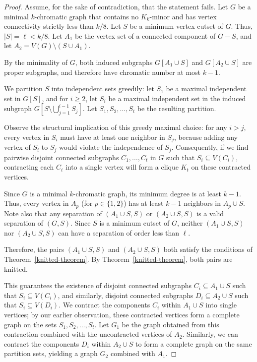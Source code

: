 \documentclass[11pt]{amsart}
\begin{document}
\begin{proof}
Assume, for the sake of contradiction, that the statement fails. Let $G$ be a minimal $k$-chromatic graph that contains no $K_k$-minor and has vertex connectivity strictly less than $k/8$. Let $S$ be a minimum vertex cutset of $G$. Thus, $|S|=\ell < k/8$. Let $A_1$ be the vertex set of a connected component of $G-S$, and let $A_2 = V(G) \setminus (S \cup A_1)$. 

By the minimality of $G$, both induced subgraphs $G[A_1\cup S]$ and $G[A_2\cup S]$ are proper subgraphs, and therefore have chromatic number at most $k-1$. 

We partition $S$ into independent sets greedily: let $S_1$ be a maximal independent set in $G[S]$, and for $i\ge 2$, let $S_i$ be a maximal independent set in the induced subgraph $G[S\setminus \bigcup_{j=1}^{i-1} S_j]$. Let $S_1, S_2, \ldots, S_t$ be the resulting partition. 

Observe the structural implication of this greedy maximal choice: for any $i > j$, every vertex in $S_i$ must have at least one neighbor in $S_j$, because adding any vertex of $S_i$ to $S_j$ would violate the independence of $S_j$. Consequently, if we find pairwise disjoint connected subgraphs $C_1, \ldots, C_t$ in $G$ such that $S_i \subseteq V(C_i)$, contracting each $C_i$ into a single vertex will form a clique $K_t$ on these contracted vertices.

Since $G$ is a minimal $k$-chromatic graph, its minimum degree is at least $k-1$. Thus, every vertex in $A_p$ (for $p \in \{1,2\}$) has at least $k-1$ neighbors in $A_p\cup S$. Note also that any separation of $(A_1\cup S, S)$ or $(A_2\cup S, S)$ is a valid separation of $(G,S)$. Since $S$ is a minimum cutset of $G$, neither $(A_1\cup S, S)$ nor $(A_2\cup S,S)$ can have a separation of order less than $\ell$.

Therefore, the pairs $(A_1\cup S, S)$ and $(A_2\cup S, S)$ both satisfy the conditions of Theorem~\ref{knitted-theorem}. By Theorem~\ref{knitted-theorem}, both pairs are knitted. 

This guarantees the existence of disjoint connected subgraphs $C_i \subseteq A_1\cup S$ such that $S_i\subseteq V(C_i)$, and similarly, disjoint connected subgraphs $D_i \subseteq A_2\cup S$ such that $S_i\subseteq V(D_i)$. We contract the components $C_i$ within $A_1\cup S$ into single vertices; by our earlier observation, these contracted vertices form a complete graph on the sets $S_1, S_2, \dots, S_t$. Let $G_1$ be the graph obtained from this contraction combined with the uncontracted vertices of $A_2$. Similarly, we can contract the components $D_i$ within $A_2\cup S$ to form a complete graph on the same partition sets, yielding a graph $G_2$ combined with $A_1$.


\end{proof}
\end{document}
